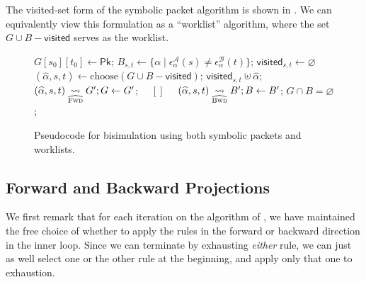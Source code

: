 \documentclass[acmsmall,dvipsnames,nonacm]{acmart}
\newcommand\Pk{\mathsf{Pk}}
\newcommand\sympk{\widehat\alpha}
\newcommand\pk{\alpha}
\newcommand\A{\mathcal{A}}
\newcommand\B{\mathcal{B}}
\newcommand\epsA{\epsilon^\A_\pk}
\newcommand\epsB{\epsilon^\B_\pk}
\newcommand\farrSing{\underset{\widehat{\textsc{Fwd}}}{\rightsquigarrow}}
\newcommand\barrSing{\underset{\widehat{\textsc{Bwd}}}{\rightsquigarrow}}
\newcommand\visited{\textsf{visited}}
\newcommand\gclbox{\quad[\!]\quad}
\begin{document}
The visited-set form of the symbolic packet algorithm is shown in .
We can equivalently view this formulation as a ``worklist'' algorithm, where the
set $G \cup B - \visited$ serves as the worklist.

\begin{figure}
\begin{algorithmic}
  \State $G[s_0][t_0] \gets \Pk$;
    \State $B_{s,t} \gets \{ \pk \mid \epsA(s) \neq \epsB(t) \}$;
    \State $\visited_{s,t} \gets \varnothing$
  \EndFor
  \While{$G\cap B\neq \varnothing \wedge G \cup B - \visited \neq \varnothing$}
    \State $(\sympk, s, t) \gets \text{choose}(G \cup B - \visited)$;
    \State $\visited_{s,t} \uplus \sympk$;
    \State $(\sympk, s, t) \farrSing G'; G \gets G'$;
    \State $\gclbox$
    \State $(\sympk, s, t) \barrSing B'; B \gets B'$;
  \EndWhile
  \Return $G\cap B = \varnothing$;
\end{algorithmic}
\caption{Pseudocode for bisimulation using both symbolic packets and worklists.}
\label{fig:vs-alg}
\end{figure}


\subsection{Forward and Backward Projections} \label{sec:strategies}

We first remark that for each iteration on the algorithm of
, we have maintained the free choice of whether to apply
the rules in the forward or backward direction in the inner loop. Since we can
terminate by exhausting \emph{either} rule, we can just as well select one or
the other rule at the beginning, and apply only that one to exhaustion.
\end{document}
